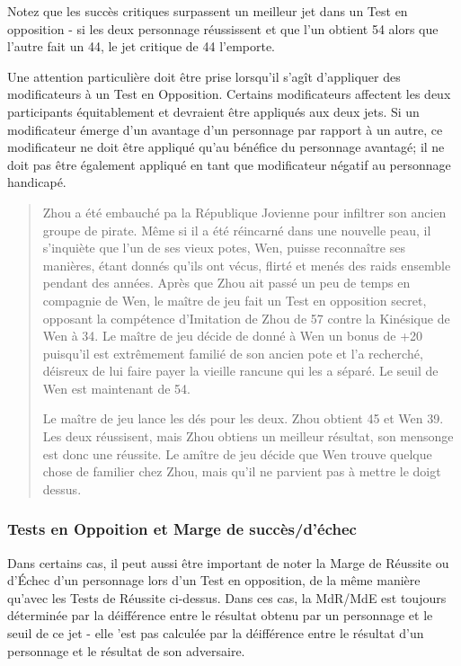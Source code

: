 Notez que les succès critiques surpassent un meilleur jet dans un Test en opposition - si les deux personnage réussissent et que l'un obtient 54 alors que l'autre fait un 44, le jet critique de 44 l'emporte. 

Une attention particulière doit être prise lorsqu'il s'agît d'appliquer des modificateurs à un Test en Opposition. Certains modificateurs affectent les deux participants équitablement et devraient être appliqués aux deux jets. Si un modificateur émerge d'un avantage d'un personnage par rapport à un autre, ce modificateur ne doit être appliqué qu'au bénéfice du personnage avantagé; il ne doit pas être également appliqué en tant que modificateur négatif au personnage handicapé. 

\begin{quotation} Zhou a été embauché pa la République Jovienne pour infiltrer son ancien groupe de pirate. Même si il a été réincarné dans une nouvelle peau, il s'inquiète que l'un de ses vieux potes, Wen, puisse reconnaître ses manières, étant donnés qu'ils ont vécus, flirté et menés des raids ensemble pendant des années. Après que Zhou ait passé un peu de temps en compagnie de Wen, le maître de jeu fait un Test en opposition secret, opposant la compétence d'Imitation de Zhou de 57 contre la Kinésique de Wen à 34. Le maître de jeu décide de donné à Wen un bonus de +20 puisqu'il est extrêmement familié de son ancien pote et l'a recherché, déisreux de lui faire payer la vieille rancune qui les a séparé. Le seuil de Wen est maintenant de 54. 

Le maître de jeu lance les dés pour les deux. Zhou obtient 45 et Wen 39. Les deux réussisent, mais Zhou obtiens un meilleur résultat, son mensonge est donc une réussite. Le amître de jeu décide que Wen trouve quelque chose de familier chez Zhou, mais qu'il ne parvient pas à mettre le doigt dessus. \end{quotation} 

\subsubsection{Tests en Oppoition et Marge de succès/d'échec} \label{sec:opposed-tests-margin} 

Dans certains cas, il peut aussi être important de noter la Marge de Réussite ou d'Échec d'un personnage lors d'un Test en opposition, de la même manière qu'avec les Tests de Réussite ci-dessus. Dans ces cas, la MdR/MdE est toujours déterminée par la déifférence entre le résultat obtenu par un personnage et le seuil de ce jet - elle 'est pas calculée par la déifférence entre le résultat d'un personnage et le résultat de son adversaire. 

